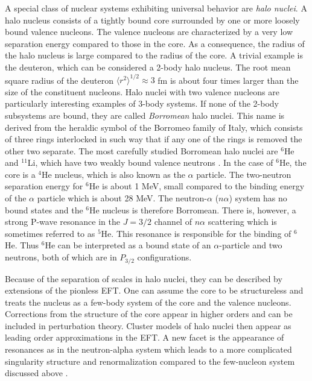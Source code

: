 \documentclass[aps,rmp,nofootinbib,twocolumn,floatfix]{revtex4}
\begin{document}
A special class of nuclear systems exhibiting universal behavior
are {\it halo nuclei}. 
A halo nucleus consists of a tightly bound core 
surrounded by one or more loosely bound valence nucleons.
The valence nucleons are characterized by a very low
separation energy compared to those in the core. 
As a consequence, the radius of the halo nucleus is large 
compared to the radius of the core.  A trivial example is the deuteron, 
which can be considered a 2-body halo nucleus. The root mean square radius of
the deuteron ${\langle r^2 \rangle}^{1/2}\approx 3$ fm is about  
four times larger than the size of the constituent nucleons. 
Halo nuclei with two valence nucleons are particularly interesting 
examples of 3-body systems.  If none of the 
2-body subsystems are bound, they are called {\it Borromean} halo nuclei. 
This name is derived from the heraldic symbol of the Borromeo family 
of Italy, which consists of three rings interlocked in such way that 
if any one of the rings is removed the other two separate.
The most
carefully studied Borromean halo nuclei are $^6$He and $^{11}$Li, 
which have two weakly bound valence neutrons \cite{Zhukov-93, Jensen-04}. 
In the case of $^6$He, the core is a $^4$He nucleus, 
which is also known as the $\alpha$ particle.
The two-neutron separation energy for $^6$He is about 1 MeV,
small compared to the binding energy of the $\alpha$ particle
which is about 28 MeV.   The neutron-$\alpha$ ($n\alpha$) system 
has no bound states and the $^6$He nucleus is therefore Borromean.
There is, however, a strong P-wave 
resonance in the $J=3/2$ channel of $n \alpha$ scattering
which is sometimes referred to as $^5$He.  This resonance is
responsible for the binding of $^6$He. Thus $^6$He
can be interpreted as a bound state of an $\alpha$-particle
and two neutrons, both of which are in 
$P_{3/2}$ configurations.

Because of the separation of scales in halo nuclei, they can be described by
extensions of the pionless EFT. 
One can assume the core to be structureless and treats 
the nucleus as a few-body system of the core and the valence nucleons.
Corrections from the structure of the core appear in higher orders and
can be included in perturbation theory. Cluster models of halo nuclei
then appear as leading order approximations in the EFT. 
A new facet is the appearance of resonances as in the neutron-alpha system
which leads to a more complicated singularity structure 
and renormalization compared to the few-nucleon system discussed above
\cite{Bertulani:2002sz}.
\end{document}
